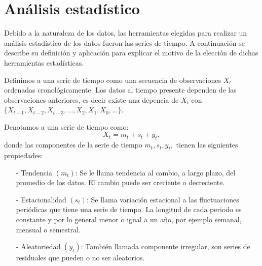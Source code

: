 \chapter{Análisis estadístico}



Debido a la naturaleza de los datos, las herramientas elegidas para realizar un análisis estadístico de los datos fueron las series de tiempo. A continuación se describe su definición y aplicación para explicar el motivo de la elección de dichas herramientas estadísticas.

Definimos a una serie de tiempo como una secuencia de observaciones $X_{t}$ ordenadas cronológicamente. Los datos al tiempo presente dependen de las observaciones anteriores, es decir existe una depencia de $X_{t}$ con $\{X_{t-1}, X_{t-2}, X_{t-3}, \ldots, X_{2}, X_{1}, X_{0}, \ldots\}$.

Denotamos a una serie de tiempo como:
  \begin{equation}
X_{t} = m_{t} + s_{t} + y_{t},
\end{equation}
donde las componentes de la serie de tiempo $m_{t}, s_{t}, y_{t},$ tienen las siguientes propiedades:

\begin{itemize}
\item[-] Tendencia $(m_{t})$: Se le llama tendencia al cambio, a largo plazo, del promedio de los datos. El cambio puede ser creciente o decreciente.

\item[-] Estacionalidad $(s_{t})$: Se llama variación estacional a las fluctuaciones periódicas que tiene una serie de tiempo. La longitud de cada periodo es constante y por lo general menor o igual a un año, por ejemplo semanal, mensual o semestral.

\item[-] Aleatoriedad $(y_{t})$: También llamada componente irregular, son series de residuales que pueden o no ser aleatorios.
\end{itemize}

